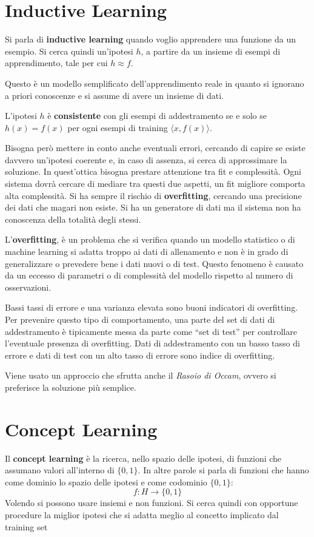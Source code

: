 \section{Inductive Learning}
Si parla di \textbf{inductive learning} quando voglio apprendere una funzione
da un esempio. Si cerca quindi un'ipotesi $h$, a partire da un insieme di esempi
di apprendimento, tale per cui $h \approx f$.

Questo è un modello semplificato dell'apprendimento reale in quanto si ignorano
a priori conoscenze e si assume di avere un insieme di dati.

L'ipotesi $h$ è \textbf{consistente} con gli esempi di addestramento se e solo
se $h(x) = f(x)$ per ogni esempi di training $\langle x, f(x)\rangle$.

Bisogna però mettere in conto anche eventuali errori, cercando di capire se esiste
davvero un'ipotesi coerente e, in caso di assenza, si cerca di approssimare la
soluzione. In quest'ottica bisogna prestare attenzione tra fit e complessità.
Ogni sistema dovrà cercare di mediare tra questi due aspetti, un fit migliore
comporta alta complessità. Si ha sempre il rischio di \textbf{overfitting},
cercando una precisione dei dati che magari non esiste. Si ha un generatore di
dati ma il sistema non ha conoscenza della totalità degli stessi.
\begin{definizione}
    L'\textbf{overfitting}, è un problema che si verifica quando un modello
    statistico o di machine learning si adatta troppo ai dati di allenamento e
    non è in grado di generalizzare o prevedere bene i dati nuovi o di test.
    Questo fenomeno è causato da un eccesso di parametri o di complessità del
    modello rispetto al numero di osservazioni.

    Bassi tassi di errore e una varianza elevata sono buoni indicatori di overfitting.
    Per prevenire questo tipo di comportamento, una parte del set di dati di
    addestramento è tipicamente messa da parte come “set di test” per controllare
    l'eventuale presenza di overfitting. Dati di addestramento con un basso tasso
    di errore e dati di test con un alto tasso di errore sono indice di overfitting.
\end{definizione}

Viene usato un approccio che sfrutta anche il \textit{Rasoio di Occam}, ovvero si
preferisce la soluzione più semplice.
\section{Concept Learning}
\begin{definizione}
    Il \textbf{concept learning} è la ricerca, nello spazio delle ipotesi, di
    funzioni che assumano valori all'interno di $\{0, 1\}$. In altre parole si
    parla di funzioni che hanno come dominio lo spazio delle ipotesi e come codominio $\{0, 1\}$:
    \begin{equation}
        f: H \to \{0, 1\}
    \end{equation}
    Volendo si possono usare insiemi e non funzioni. Si cerca quindi con opportune
    procedure la miglior ipotesi che si adatta meglio al concetto implicato dal
    training set
\end{definizione}

